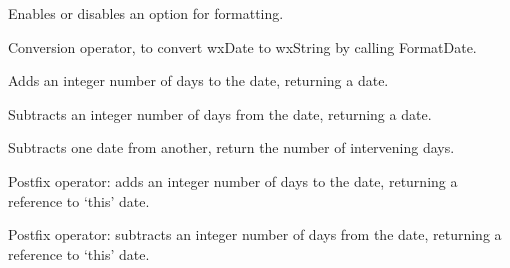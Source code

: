 \label{wxdatesetoption}


Enables or disables an option for formatting.



\label{wxdatewxstring}


Conversion operator, to convert wxDate to wxString by calling FormatDate.

\label{wxdateplus}



Adds an integer number of days to the date, returning a date.

\label{wxdateminus}



Subtracts an integer number of days from the date, returning a date.


Subtracts one date from another, return the number of intervening days.

\label{wxdateplusequals}


Postfix operator: adds an integer number of days to the date, returning
a reference to `this' date.

\label{wxdateminusequals}


Postfix operator: subtracts an integer number of days from the date, returning
a reference to `this' date.

